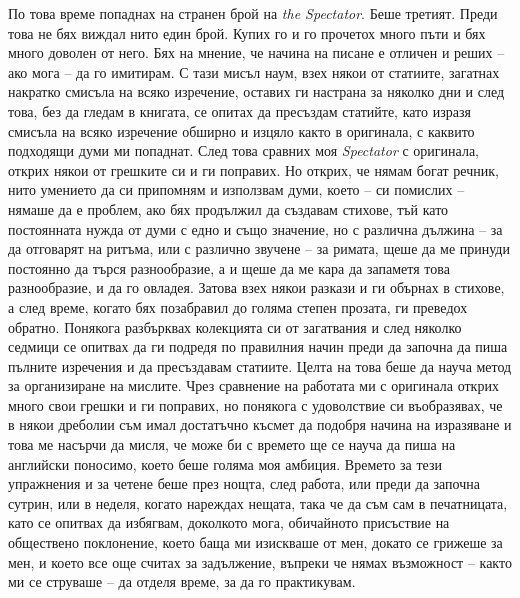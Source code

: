 \documentclass[12pt]{book}
\begin{document}
По това време попаднах на странен брой на \textit{the Spectator}. Беше третият. Преди това не бях виждал нито един брой. Купих го и го прочетох много пъти и бях много доволен от него. Бях на мнение, че начина на писане е отличен и реших – ако мога – да го имитирам. С тази мисъл наум, взех някои от статиите, загатнах накратко смисъла на всяко изречение, оставих ги настрана за няколко дни и след това, без да гледам в книгата, се опитах да пресъздам статийте, като изразя смисъла на всяко изречение обширно и изцяло както в оригинала, с каквито подходящи думи ми попаднат. След това сравних моя \textit{Spectator} с оригинала, открих някои от грешките си и ги поправих. Но открих, че нямам богат речник, нито умението да си припомням и използвам думи, което – си помислих – нямаше да е проблем, ако бях продължил да създавам стихове, тъй като постоянната нужда от думи с едно и също значение, но с различна дължина – за да отговарят на ритъма, или с различно звучене – за римата, щеше да ме принуди постоянно да търся разнообразие, а и щеше да ме кара да запаметя това разнообразие, и да го овладея. Затова взех някои разкази и ги обърнах в стихове, а след време, когато бях позабравил до голяма степен прозата, ги преведох обратно. Понякога разбърквах колекцията си от загатвания и след няколко седмици се опитвах да ги подредя по правилния начин преди да започна да пиша пълните изречения и да пресъздавам статиите. Целта на това беше да науча метод за организиране на мислите. Чрез сравнение на работата ми с оригинала открих много свои грешки и ги поправих, но понякога с удоволствие си въобразявах, че в някои дреболии съм имал достатъчно късмет да подобря начина на изразяване и това ме насърчи да мисля, че може би с времето ще се науча да пиша на английски поносимо, което беше голяма моя амбиция. Времето за тези упражнения и за четене беше през нощта, след работа, или преди да започна сутрин, или в неделя, когато нареждах нещата, така че да съм сам в печатницата, като се опитвах да избягвам, доколкото мога, обичайното присъствие на обществено поклонение, което баща ми изискваше от мен, докато се грижеше за мен, и което все още считах за задължение, въпреки че нямах възможност – както ми се струваше – да отделя време, за да го практикувам.
\end{document}
